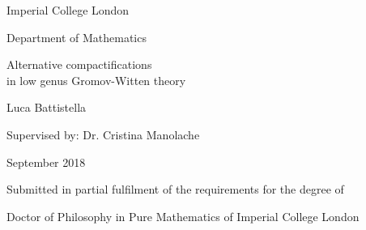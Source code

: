 

{\thispagestyle{empty}

\centering


{\Large
Imperial College London

Department of Mathematics

}

\vspace*{45mm}
{\huge \bfseries

Alternative compactifications \\ in low genus Gromov-Witten theory

} 

\vspace*{2cm}

{\Large 

Luca Battistella

\vspace*{3cm}
}

{\large
Supervised by: Dr. Cristina Manolache
\vspace*{1cm}}

{\large
September 2018
}

\vspace*{4cm}

{\normalsize

Submitted in partial fulfilment of the requirements for the degree of

Doctor of Philosophy in Pure Mathematics
of Imperial College London
}

}

